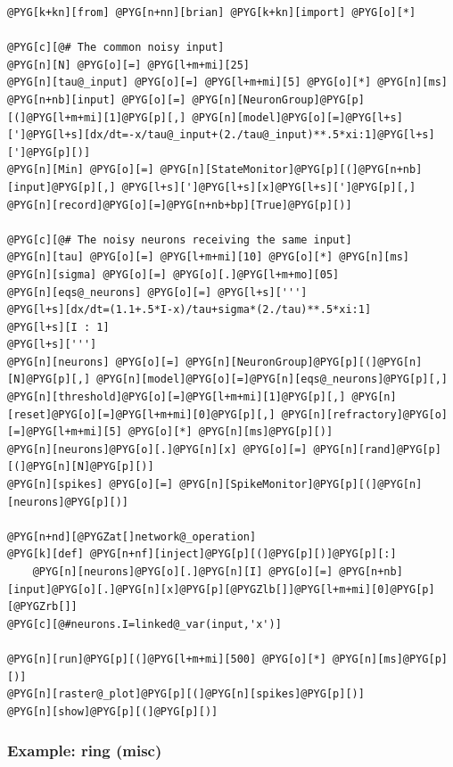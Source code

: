 \documentclass[letterpaper,10pt,english]{manual}
\begin{document}
\begin{Verbatim}[commandchars=@\[\]]
@PYG[k+kn][from] @PYG[n+nn][brian] @PYG[k+kn][import] @PYG[o][*]

@PYG[c][@# The common noisy input]
@PYG[n][N] @PYG[o][=] @PYG[l+m+mi][25]
@PYG[n][tau@_input] @PYG[o][=] @PYG[l+m+mi][5] @PYG[o][*] @PYG[n][ms]
@PYG[n+nb][input] @PYG[o][=] @PYG[n][NeuronGroup]@PYG[p][(]@PYG[l+m+mi][1]@PYG[p][,] @PYG[n][model]@PYG[o][=]@PYG[l+s][']@PYG[l+s][dx/dt=-x/tau@_input+(2./tau@_input)**.5*xi:1]@PYG[l+s][']@PYG[p][)]
@PYG[n][Min] @PYG[o][=] @PYG[n][StateMonitor]@PYG[p][(]@PYG[n+nb][input]@PYG[p][,] @PYG[l+s][']@PYG[l+s][x]@PYG[l+s][']@PYG[p][,] @PYG[n][record]@PYG[o][=]@PYG[n+nb+bp][True]@PYG[p][)]

@PYG[c][@# The noisy neurons receiving the same input]
@PYG[n][tau] @PYG[o][=] @PYG[l+m+mi][10] @PYG[o][*] @PYG[n][ms]
@PYG[n][sigma] @PYG[o][=] @PYG[o][.]@PYG[l+m+mo][05]
@PYG[n][eqs@_neurons] @PYG[o][=] @PYG[l+s][''']
@PYG[l+s][dx/dt=(1.1+.5*I-x)/tau+sigma*(2./tau)**.5*xi:1]
@PYG[l+s][I : 1]
@PYG[l+s][''']
@PYG[n][neurons] @PYG[o][=] @PYG[n][NeuronGroup]@PYG[p][(]@PYG[n][N]@PYG[p][,] @PYG[n][model]@PYG[o][=]@PYG[n][eqs@_neurons]@PYG[p][,] @PYG[n][threshold]@PYG[o][=]@PYG[l+m+mi][1]@PYG[p][,] @PYG[n][reset]@PYG[o][=]@PYG[l+m+mi][0]@PYG[p][,] @PYG[n][refractory]@PYG[o][=]@PYG[l+m+mi][5] @PYG[o][*] @PYG[n][ms]@PYG[p][)]
@PYG[n][neurons]@PYG[o][.]@PYG[n][x] @PYG[o][=] @PYG[n][rand]@PYG[p][(]@PYG[n][N]@PYG[p][)]
@PYG[n][spikes] @PYG[o][=] @PYG[n][SpikeMonitor]@PYG[p][(]@PYG[n][neurons]@PYG[p][)]

@PYG[n+nd][@PYGZat[]network@_operation]
@PYG[k][def] @PYG[n+nf][inject]@PYG[p][(]@PYG[p][)]@PYG[p][:]
    @PYG[n][neurons]@PYG[o][.]@PYG[n][I] @PYG[o][=] @PYG[n+nb][input]@PYG[o][.]@PYG[n][x]@PYG[p][@PYGZlb[]]@PYG[l+m+mi][0]@PYG[p][@PYGZrb[]]
@PYG[c][@#neurons.I=linked@_var(input,'x')]

@PYG[n][run]@PYG[p][(]@PYG[l+m+mi][500] @PYG[o][*] @PYG[n][ms]@PYG[p][)]
@PYG[n][raster@_plot]@PYG[p][(]@PYG[n][spikes]@PYG[p][)]
@PYG[n][show]@PYG[p][(]@PYG[p][)]
\end{Verbatim}

\resetcurrentobjects
\hypertarget{--doc-examples-misc_ring}{}

\hypertarget{index-65}{}\subsubsection{Example: ring (misc)}
\end{document}
